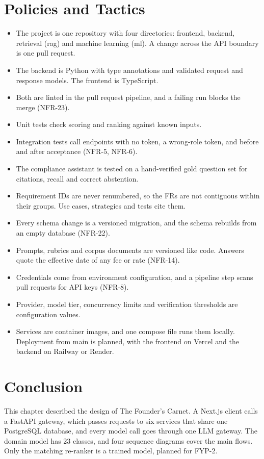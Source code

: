 \documentclass{FastFyp}
\begin{document}
\section{Policies and Tactics}
\label{sec:dbchange}
\begin{itemize}
    \item The project is one repository with four directories: frontend, backend, retrieval (rag) and machine learning (ml). A change across the API boundary is one pull request.
    \item The backend is Python with type annotations and validated request and response models. The frontend is TypeScript.
    \item Both are linted in the pull request pipeline, and a failing run blocks the merge (NFR-23).
    \item Unit tests check scoring and ranking against known inputs.
    \item Integration tests call endpoints with no token, a wrong-role token, and before and after acceptance (NFR-5, NFR-6).
    \item The compliance assistant is tested on a hand-verified gold question set for citations, recall and correct abstention.
    \item Requirement IDs are never renumbered, so the FRs are not contiguous within their groups. Use cases, strategies and tests cite them.
    \item Every schema change is a versioned migration, and the schema rebuilds from an empty database (NFR-22).
    \item Prompts, rubrics and corpus documents are versioned like code. Answers quote the effective date of any fee or rate (NFR-14).
    \item Credentials come from environment configuration, and a pipeline step scans pull requests for API keys (NFR-8).
    \item Provider, model tier, concurrency limits and verification thresholds are configuration values.
    \item Services are container images, and one compose file runs them locally. Deployment from main is planned, with the frontend on Vercel and the backend on Railway or Render.
\end{itemize}

\section{Conclusion}
This chapter described the design of The Founder's Carnet. A Next.js client calls a FastAPI gateway, which passes requests to six services that share one PostgreSQL database, and every model call goes through one LLM gateway. The domain model has 23 classes, and four sequence diagrams cover the main flows. Only the matching re-ranker is a trained model, planned for FYP-2.
\end{document}
